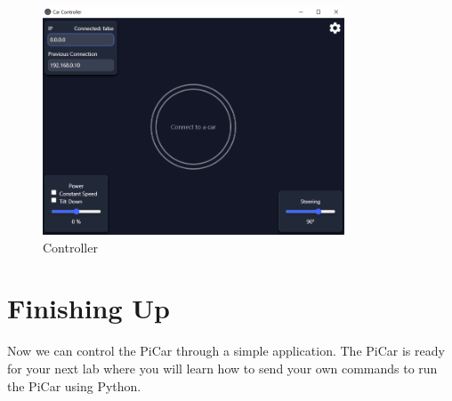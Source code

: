 \documentclass[11pt]{report}
\begin{document}
\begin{figure}[h]
    \centering
    \includegraphics[width=0.8\textwidth]{controller.png}
    \caption{Controller}
    \label{fig:Controller}
\end{figure}

\chapter{Finishing Up}
Now we can control the PiCar through a simple application. The PiCar is ready for your next lab where you will learn how to send your own commands to run the PiCar using Python.
\end{document}
